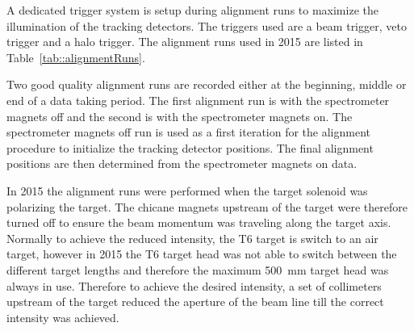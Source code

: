 A dedicated trigger system is setup during alignment runs to maximize the
illumination of the tracking detectors.  The triggers used are a beam trigger,
veto trigger and a halo trigger.  The alignment runs used in 2015 are listed in
Table~\ref{tab::alignmentRuns}. \par

Two good quality alignment runs are recorded either at the beginning, middle or
end of a data taking period.  The first alignment run is with the spectrometer
magnets off and the second is with the spectrometer magnets on.  The
spectrometer magnets off run is used as a first iteration for the alignment
procedure to initialize the tracking detector positions.  The final alignment
positions are then determined from the spectrometer magnets on data.

In 2015 the alignment runs were performed when the target solenoid was
polarizing the target.  The chicane magnets upstream of the target were
therefore turned off to ensure the beam momentum was traveling along the target
axis.  Normally to achieve the reduced intensity, the T6 target is switch to an
air target, however in 2015 the T6 target head was not able to switch between
the different target lengths and therefore the maximum 500~mm target head was
always in use.  Therefore to achieve the desired intensity, a set of collimeters
upstream of the target reduced the aperture of the beam line till the correct
intensity was achieved.

